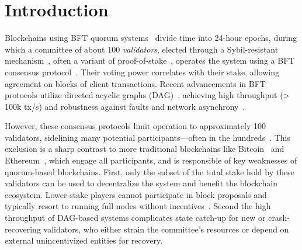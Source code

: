 \section{Introduction}

Blockchains using BFT quorum systems~\cite{sui,aptos,solana} divide time into 24-hour epochs, during which a committee of about 100 \emph{validators}, elected through a Sybil-resistant mechanism~\cite{douceur2002sybil}, often a variant of proof-of-stake~\cite{kucci2021proof}, operates the system using a BFT consensus protocol~\cite{pbft,jolteon,mysticeti}. Their voting power correlates with their stake, allowing agreement on blocks of client transactions. Recent advancements in BFT protocols utilize directed acyclic graphs (DAG)~\cite{narwhal,bullshark,shoal++,mysticeti,sailfish,bbca-chain,gradeddag,cordial-miners,fin,fino}, achieving high throughput (> 100k tx/s) and robustness against faults and network asynchrony~\cite{consensus-dos,narwhal}.

However, these consensus protocols limit operation to approximately 100 validators, sidelining many potential participants---often in the hundreds~\cite{sui-scan}. This exclusion is a sharp contrast to more traditional blockchains like Bitcoin~\cite{bitcoin} and Ethereum~\cite{ethereum}, which engage all participants, and is responsible of key weaknesses of quorum-based blockchains.
First, only the subset of the total stake hold by these validators can be used to decentralize the system and benefit the blockchain ecosystem. Lower-stake players cannot participate in block proposals and typically resort to running full nodes without incentives~\cite{krol2024disc}.
Second the high throughput of DAG-based systems complicates state catch-up for new or crash-recovering validators, who either strain the committee's resources or depend on external unincentivized entities for recovery.

